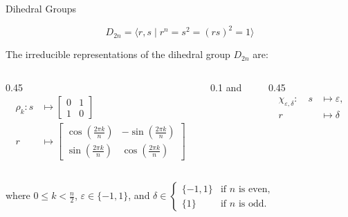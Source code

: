 \documentclass[14pt,aspectratio=169]{beamer}
\begin{document}
\begin{frame}{\color{aoblue}Dihedral Groups}

\[
D_{2n} = \langle r, s \mid r^n = s^2 = (rs)^2 = 1 \rangle
\]

\begin{theorem}
The irreducible representations of the dihedral group \( D_{2n} \) are:
\begin{columns}
    \begin{column}{0.45\textwidth}
        \begin{align*}
            \rho_k \colon  s &\mapsto \begin{bmatrix}
                0 & 1 \\
                1 & 0
            \end{bmatrix}\\
            r &\mapsto \begin{bmatrix}
                \cos\left(\frac{2\pi k}{n}\right) & -\sin\left(\frac{2\pi k}{n}\right) \\
                \sin\left(\frac{2\pi k}{n}\right) & \cos\left(\frac{2\pi k}{n}\right)
            \end{bmatrix}
        \end{align*}
    \end{column}
    
    \begin{column}{0.1\textwidth}
        \centering
        \small{and}
    \end{column}
    
    \begin{column}{0.45\textwidth}
        \begin{align*}
            \chi_{\varepsilon, \delta} \colon \quad 
            s &\mapsto \varepsilon, \\
            r &\mapsto \delta
        \end{align*}
    \end{column}
\end{columns}



\noindent
\small{
where \( 0 \leq k < \frac{n}{2} \), \( \varepsilon \in \{-1, 1\} \), and
$ 
\delta \in 
\begin{cases}
    \{-1, 1\} & \text{if } n \text{ is even}, \\
    \{1\} & \text{if } n \text{ is odd}.
\end{cases}
$
}

\end{theorem}
\end{frame}
\end{document}
